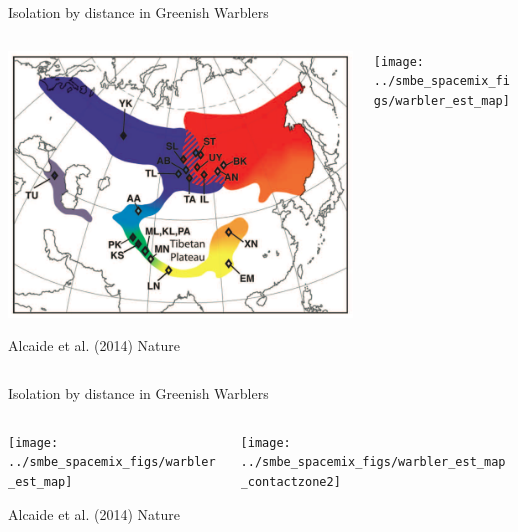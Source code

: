 \documentclass{beamer}
\begin{document}
\begin{frame}{Isolation by distance in Greenish Warblers}

\begin{columns}
\begin{column}{0.4\textwidth}

	\begin{center} \includegraphics[width=\textwidth]{../smbe_spacemix_figs/Irwin_warbler_map_figure}
\end{center}
	\vskip -0.5cm
          {\tiny Alcaide et al. (2014) Nature} 
\end{column}
\begin{column}{0.6\textwidth}
\pause 

	\begin{center} \texttt{[image: ../smbe\_spacemix\_figs/warbler\_est\_map]}
 \end{center}
\end{column}
\end{columns}
\end{frame}

\begin{frame}{Isolation by distance in Greenish Warblers}

\begin{columns}
\begin{column}{0.4\textwidth}

	\begin{center} \texttt{[image: ../smbe\_spacemix\_figs/warbler\_est\_map]}
\end{center}
	\vskip -0.5cm
          {\tiny Alcaide et al. (2014) Nature} 
\end{column}
\begin{column}{0.6\textwidth}
\pause 

	\begin{center} \texttt{[image: ../smbe\_spacemix\_figs/warbler\_est\_map\_contactzone2]}
 \end{center}
\end{column}
\end{columns}
\end{frame}
\end{document}
